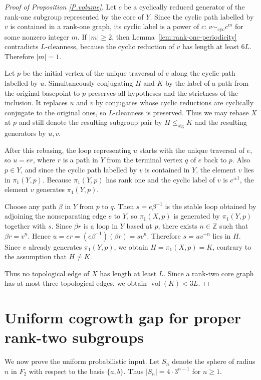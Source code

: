 \documentclass{amsproc}
\newcommand{\vol}{\operatorname{vol}}
\newcommand{\alg}{\operatorname{alg}}
\begin{document}
\begin{proof}[Proof of Proposition \ref{P.volume}]
Let $c$ be a cyclically reduced generator of the rank-one subgroup represented
by the core of $Y$.  Since the cyclic path labelled by $v$ is contained in a
rank-one graph, its cyclic label is a power of $c$: $v \sim_{\mathrm{cyc}} c^m$
for some nonzero integer $m$.
If \(|m|\geq 2\), then Lemma~\ref{lem:rank-one-periodicity} contradicts
\(L\)-cleanness, because the cyclic reduction of \(v\) has length at least
\(6L\).  Therefore \(|m|=1\).

Let $p$ be the initial vertex of the unique traversal of $e$ along the cyclic
path labelled by $u$.  Simultaneously conjugating $H$ and $K$ by the label of a
path from the original basepoint to $p$ preserves all hypotheses and the
strictness of the inclusion.  It replaces $u$ and $v$ by conjugates whose
cyclic reductions are cyclically conjugate to the original ones, so
$L$-cleanness is preserved.  Thus we may rebase $X$ at $p$ and still denote the
resulting subgroup pair by $H\leq_{\alg}K$ and the resulting generators by
$u,v$.

After this rebasing, the loop representing $u$ starts with the unique traversal
of $e$, so $u=er$,
where $r$ is a path in $Y$ from the terminal vertex $q$ of $e$ back to $p$.
Also $p\in Y$, and since the cyclic path labelled by $v$ is contained in $Y$,
the element $v$ lies in $\pi_1(Y,p)$.  Because $\pi_1(Y,p)$ has rank one and the
cyclic label of $v$ is $c^{\pm1}$, the element $v$ generates $\pi_1(Y,p)$.

Choose any path $\beta$ in $Y$ from $p$ to $q$.  Then
$s=e\beta^{-1}$ is the stable loop obtained by adjoining the nonseparating edge
$e$ to $Y$, so $\pi_1(X,p)$ is generated by $\pi_1(Y,p)$ together with $s$.
Since $\beta r$ is a loop in $Y$ based at $p$, there exists $n\in\mathbb Z$
such that $\beta r=v^n$.  Hence $u=er=(e\beta^{-1})(\beta r)=s v^n$.
Therefore $s=u v^{-n}$ lies in $H$.  Since $v$ already generates
$\pi_1(Y,p)$, we obtain $H=\pi_1(X,p)=K$,
contrary to the assumption that $H \not =K$.

Thus no topological edge of $X$ has length at least $L$.  Since a rank-two
core graph has at most three topological edges, we obtain $\vol(K)<3L$.
\end{proof}

\section{Uniform cogrowth gap for proper rank-two subgroups}\label{S.cogrowth}

We now prove the uniform probabilistic input.
Let $S_n$ denote the sphere of radius $n$ in $F_2$ with respect to the basis
$\{a,b\}$.  Thus
$
        |S_n|=4\cdot 3^{n-1}
$
for $n\geq 1$.
\end{document}
